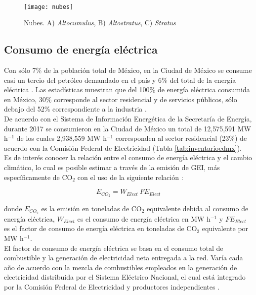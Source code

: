 \\

\begin{figure}[htb]
  \centering
    \texttt{[image: nubes]}
  \caption{Nubes. A) \textit{Altocumulus}, B) \textit{Altostratus}, C) \textit{Stratus} \citep{Metoffice2019}}
  \label{nubes}
\end{figure}

\newpage

\subsection{Consumo de energía eléctrica}
\label{subsec:consumoenergiaelectrica}

Con sólo 7\% de la población total de México, en la Ciudad de México se consume casi un tercio del petróleo demandado en el país y 6\% del total de la energía eléctrica \citep{SENER2013}. Las estadísticas muestran que del 100\% de energía eléctrica consumida en México, 30\% corresponde al sector residencial y de servicios públicos, sólo debajo del 52\% correspondiente a la industria \citep{Ramos2012}.\\

De acuerdo con el Sistema de Información Energética de la Secretaría de Energía, durante 2017 se consumieron en la Ciudad de México un total de 12,575,591 MW h$^{-1}$ de los cuales 2,938,559 MW h$^{-1}$ corresponden al sector residencial (23\%) de acuerdo con la Comisión Federal de Electricidad (Tabla \ref{tab:inventariocdmx}).\\

Es de interés conocer la relación entre el consumo de energía eléctrica y el cambio climático, lo cual es posible estimar a través de la emisión de GEI, más específicamente de CO$_{2}$ con el uso de la siguiente relación \citep{UTSEDEMA2018}: 

\begin{equation}
E_{CO_{2}} = W_{Elect}\: FE_{Elect}
\end{equation}

donde $E_{CO_{2}}$ es la emisión en toneladas de CO$_{2}$ equivalente debida al consumo de energía eléctrica, $W_{Elect}$ es el consumo de energía eléctrica en MW h$^{-1}$ y $FE_{Elect}$ es el factor de consumo de energía eléctrica en toneladas de CO$_{2}$ equivalente por MW h$^{-1}$.\\

El factor de consumo de energía eléctrica se basa en el consumo total de combustible y la generación de electricidad neta entregada a la red. Varía cada año de acuerdo con la mezcla de combustibles empleados en la generación de electricidad distribuida por el Sistema Eléctrico Nacional, el cual está integrado por la Comisión Federal de Electricidad y productores independientes \citep{GEI2013}.\\

